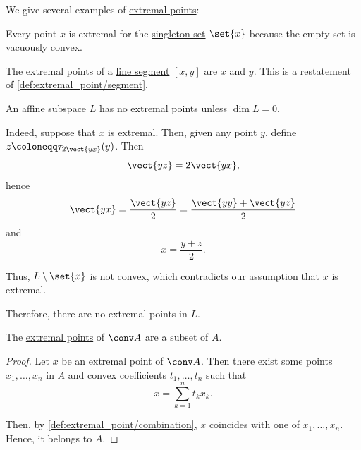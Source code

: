 \begin{example}\label{ex:def:extremal_point}
  We give several examples of \hyperref[def:extremal_point]{extremal points}:
  \begin{thmenum}
     Every point \( x \) is extremal for the \hyperref[def:singleton_set]{singleton set} \( \set{ x } \) because the empty set is vacuously convex.

     The extremal points of a \hyperref[def:line_segment]{line segment} \( [x, y] \) are \( x \) and \( y \). This is a restatement of \cref{def:extremal_point/segment}.

     An affine subspace \( L \) has no extremal points unless \( \dim L = 0 \).

    Indeed, suppose that \( x \) is extremal. Then, given any point \( y \), define \( z \coloneqq \tau_{2 \vect{yx}}(y) \). Then
    \begin{equation*}
      \vect{yz} = 2 \vect{yx},
    \end{equation*}
    hence
    \begin{equation*}
      \vect{yx} = \frac {\vect{yz}} 2 = \frac {\vect{yy} + \vect{yz}} 2
    \end{equation*}
    and
    \begin{equation*}
      x = \frac {y + z} 2.
    \end{equation*}

    Thus, \( L \setminus \set{ x } \) is not convex, which contradicts our assumption that \( x \) is extremal.

    Therefore, there are no extremal points in \( L \).
  \end{thmenum}
\end{example}

\begin{proposition}\label{thm:extremal_points_of_convex_hull}
  The \hyperref[def:extremal_point]{extremal points} of \( \conv A \) are a subset of \( A \).
\end{proposition}
\begin{proof}
  Let \( x \) be an extremal point of \( \conv A \). Then there exist some points \( x_1, \ldots, x_n \) in \( A \) and convex coefficients \( t_1, \ldots, t_n \) such that
  \begin{equation*}
    x = \sum_{k=1}^n t_k x_k.
  \end{equation*}

  Then, by \cref{def:extremal_point/combination}, \( x \) coincides with one of \( x_1, \ldots, x_n \). Hence, it belongs to \( A \).
\end{proof}

